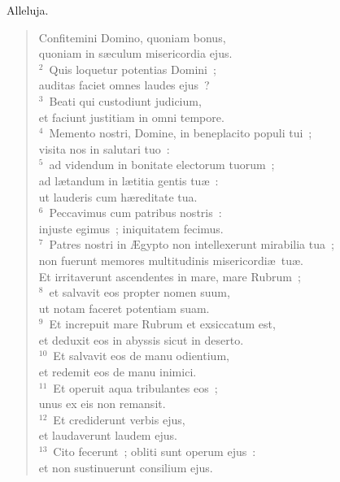 \lettrine[lines=3,image=true,loversize=0.05,lraise=-0.03]{A}{}lleluja. \begin{flushleft}\begin{verse}\vspace{6pt}Confitemini Domino, quoniam bonus,\\ quoniam in s\ae culum misericordia ejus.\\
${}^{2}$~Quis loquetur potentias Domini~;\\ auditas faciet omnes laudes ejus~?\\
${}^{3}$~Beati qui custodiunt judicium,\\ et faciunt justitiam in omni tempore.\\
${}^{4}$~Memento nostri, Domine, in beneplacito populi tui~;\\ visita nos in salutari tuo~:\\
${}^{5}$~ad videndum in bonitate electorum tuorum~;\\ ad l\ae tandum in l\ae titia gentis tu\ae~:\\ ut lauderis cum h\ae reditate tua.\\
${}^{6}$~Peccavimus cum patribus nostris~:\\ injuste egimus~; iniquitatem fecimus.\\
${}^{7}$~Patres nostri in \AE gypto non intellexerunt mirabilia tua~;\\ non fuerunt memores multitudinis misericordi\ae\ tu\ae .\\ Et irritaverunt ascendentes in mare, mare Rubrum~;\\
${}^{8}$~et salvavit eos propter nomen suum,\\ ut notam faceret potentiam suam.\\
${}^{9}$~Et increpuit mare Rubrum et exsiccatum est,\\ et deduxit eos in abyssis sicut in deserto.\\
${}^{10}$~Et salvavit eos de manu odientium,\\ et redemit eos de manu inimici.\\
${}^{11}$~Et operuit aqua tribulantes eos~;\\ unus ex eis non remansit.\\
${}^{12}$~Et crediderunt verbis ejus,\\ et laudaverunt laudem ejus.\\
${}^{13}$~Cito fecerunt~; obliti sunt operum ejus~:\\ et non sustinuerunt consilium ejus.\\

\end{verse}
\end{flushleft}
